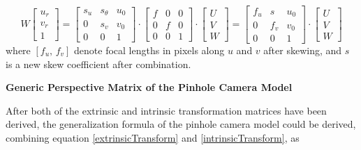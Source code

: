 \begin{equation}
%
W \left[ \begin{array}{c} u_r \\ v_r \\ 1 \end{array} \right] %
=  \begin{bmatrix} s_u & s_\theta & u_0 \\ 0 & s_v & v_0 \\ 0 & 0 & 1 \end{bmatrix} \cdot%
 \begin{bmatrix} f & 0 & 0 \\ 0 & f & 0 \\ 0 & 0 & 1 \end{bmatrix} \cdot %
\left[ \begin{array}{c} U \\ V \\ W \end{array} \right]%
=  \begin{bmatrix} f_u & s & u_0 \\ 0 & f_v & v_0 \\ 0 & 0 & 1 \end{bmatrix} \cdot%
\left[ \begin{array}{c} U \\ V \\ W \end{array} \right]%
%
\label{intrinsicTransform}
\end{equation}%
%
where \([f_u,\, f_v]\) denote focal lengths in pixels along \(u\) and \(v\) after skewing, and \(s\) is a new skew coefficient after combination.\\\par%
%
\textbf{Generic Perspective Matrix of the Pinhole Camera Model}\par%
\noindent
After both of the extrinsic and intrinsic transformation matrices have been derived, the generalization formula of the pinhole camera model could be derived, combining equation \ref{extrinsicTransform} and \ref{intrinsicTransform}, as

